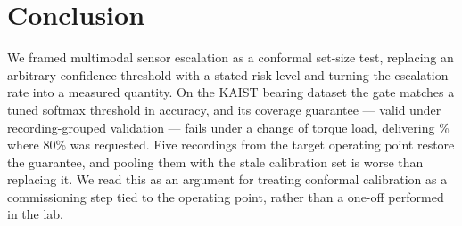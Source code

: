 \documentclass{article}
\begin{document}
\section{Conclusion}
We framed multimodal sensor escalation as a conformal set-size test,
replacing an arbitrary confidence threshold with a stated risk level and
turning the escalation rate into a measured quantity. On the KAIST bearing
dataset the gate matches a tuned softmax threshold in accuracy, and its
coverage guarantee --- valid under recording-grouped validation --- fails
under a change of torque load, delivering \covEighty\% where 80\% was
requested. Five recordings from the target operating point restore the
guarantee, and pooling them with the stale calibration set is worse than
replacing it. We read this as an argument for treating conformal
calibration as a commissioning step tied to the operating point, rather
than a one-off performed in the lab.



\end{document}
